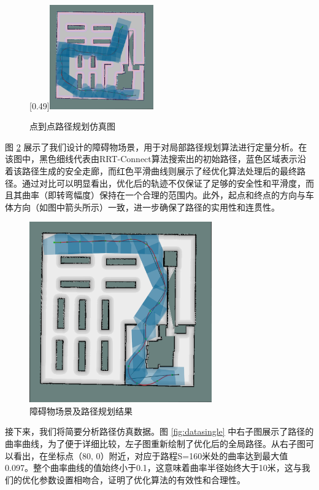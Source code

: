 \documentclass[master,academic]{ysuthesis} %
\begin{document}
\begin{figure}[!ht]
			\subcaptionbox{\label{fig:single_4}}[0.49\textwidth]{\includegraphics[width=0.4\textwidth]{single_4.png}}
			\caption{点到点路径规划仿真图}
			\label{fig:点到点路径规划仿真案例}
		\end{figure}

		图 \ref{fig:single} 展示了我们设计的障碍物场景，用于对局部路径规划算法进行定量分析。在该图中，黑色细线代表由RRT-Connect算法搜索出的初始路径，蓝色区域表示沿着该路径生成的安全走廊，而红色平滑曲线则展示了经优化算法处理后的最终路径。通过对比可以明显看出，优化后的轨迹不仅保证了足够的安全性和平滑度，而且其曲率（即转弯幅度）保持在一个合理的范围内。此外，起点和终点的方向与车体方向（如图中箭头所示）一致，进一步确保了路径的实用性和连贯性。
		\begin{figure}[!ht]
			\centering
			\includegraphics[width=0.7\textwidth]{single.png}
			\caption{障碍物场景及路径规划结果}
			\label{fig:single}
		\end{figure}

		接下来，我们将简要分析路径仿真数据。图 \ref{fig:datasingle} 中右子图展示了路径的曲率曲线，为了便于详细比较，左子图重新绘制了优化后的全局路径。从右子图可以看出，在坐标点（80, 0）附近，对应于路程S=160米处的曲率达到最大值0.097。整个曲率曲线的值始终小于0.1，这意味着曲率半径始终大于10米，这与我们的优化参数设置相吻合，证明了优化算法的有效性和合理性。
\end{document}

